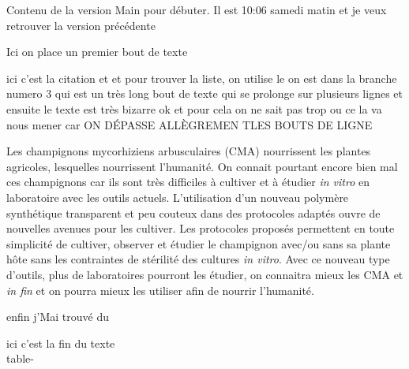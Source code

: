 \documentclass{sn-jnl}%
\begin{document}
Contenu de la version Main pour débuter. Il est 10:06 samedi matin et je veux retrouver la version précédente



	Ici on place un premier bout de texte

 ici c'est la citation \cite{declerck_vitro_2005}et
\cite{fortin_arbuscular_2002}et pour trouver la liste,
\cite{silvani_novel_2019}on utilise le on est dans la branche numero 3 qui est
un très long bout de texte qui se prolonge sur plusieurs lignes et ensuite le
texte est très bizarre ok et pour cela on ne sait pas trop ou ce la va nous
mener car ON DÉPASSE ALLÈGREMEN TLES BOUTS DE LIGNE 



 Les champignons mycorhiziens arbusculaires (CMA) nourrissent les plantes
agricoles, lesquelles nourrissent l'humanité. On connait pourtant encore bien
mal ces champignons car ils sont très difficiles à cultiver et à étudier
\emph{in vitro} en laboratoire avec les outils actuels. L'utilisation d'un
nouveau polymère synthétique transparent et peu couteux dans des protocoles
adaptés ouvre de nouvelles avenues pour les cultiver. Les protocoles proposés
permettent en toute simplicité de cultiver, observer et étudier le champignon
avec/ou sans sa plante hôte sans les contraintes de stérilité des cultures
\textit{in vitro}. Avec ce nouveau type d'outils, plus de laboratoires pourront
les étudier, on connaitra mieux les CMA et \textit{in fin} et on pourra mieux
les utiliser afin de nourrir l'humanité.





enfin j'Mai trouvé du 


	ici c'est la fin du texte\\

	table-
\end{document}
